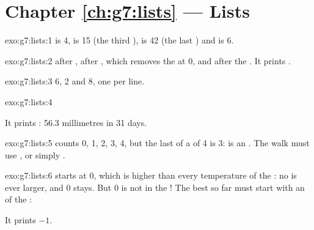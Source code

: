 \section*{Chapter \ref{ch:g7:lists} --- Lists}

\begin{solution}{exo:g7:lists:1}
 is 4,  is 15 (the third ),  is 42 (the
last ) and  is 6.
\end{solution}

\begin{solution}{exo:g7:lists:2}
\code{[1, 2, 3, 4]} after , \code{[2, 3, 4]} after ,
which removes the  at  0, and \code{[2, 9, 3, 4]} after the
. It prints \code{[2, 9, 3, 4]}.
\end{solution}

\begin{solution}{exo:g7:lists:3}
6, 2 and 8, one per line.
\end{solution}

\begin{solution}{exo:g7:lists:4}
\label{lst:g7:lists:sol-average}

It prints : 56.3 millimetres in 31 days.
\end{solution}

\begin{solution}{exo:g7:lists:5}
 counts 0, 1, 2, 3, 4, but the last  of a 
of 4  is 3:  is an . The walk must use
, or simply .
\end{solution}

\begin{solution}{exo:g7:lists:6}
 starts at 0, which is higher than every temperature of the :
no  is ever larger, and 0 stays. But 0 is not in the ! The best so far
must start with an  of the :

\label{lst:g7:lists:sol-largest}

It prints $-1$.
\end{solution}

